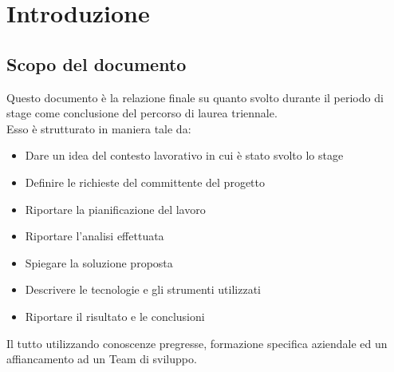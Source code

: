 \chapter{Introduzione}
\label{chap:introduzione}

\section{Scopo del documento}
\label{sec:scopodeldocumento}
Questo documento è la relazione finale su quanto svolto durante il periodo di stage come conclusione del percorso di laurea triennale.   \\

Esso è strutturato in maniera tale da:
\begin{itemize}
    \item Dare un idea del contesto lavorativo in cui è stato svolto lo stage
    \item Definire le richieste del committente del progetto
    \item Riportare la pianificazione del lavoro
    \item Riportare l'analisi effettuata
    \item Spiegare la soluzione proposta
    \item Descrivere le tecnologie e gli strumenti utilizzati
    \item Riportare il risultato e le conclusioni
\end{itemize}


Il tutto utilizzando conoscenze pregresse, formazione specifica aziendale ed un affiancamento ad un Team di sviluppo.






%




